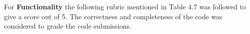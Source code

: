 



\newpage

For \textbf{Functionality} the following rubric mentioned in Table 4.7 was followed to give a score out of 5. The correctness and completeness of the code was considered to grade the code submissions.

